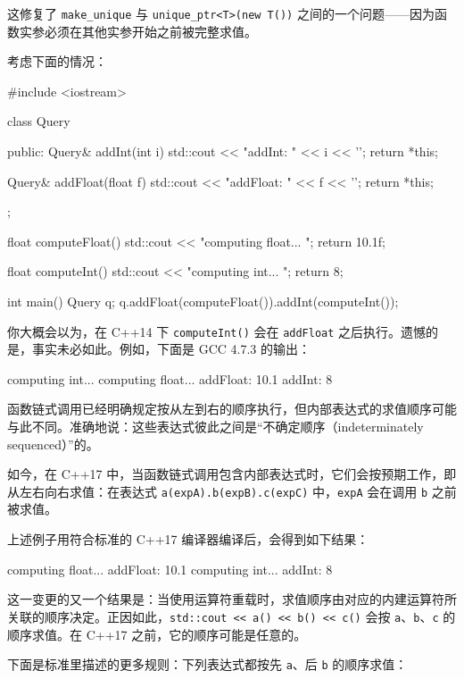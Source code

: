 这修复了 \texttt{make\_unique} 与 \texttt{unique\_ptr<T>(new T())} 之间的一个问题——因为函数实参必须在其他实参开始之前被完整求值。

考虑下面的情况：

\begin{codebox}[cpp]
#include <iostream>

class Query
{
public:
    Query& addInt(int i)
    {
        std::cout << "addInt: " << i << '\n';
        return *this;
    }

    Query& addFloat(float f)
    {
        std::cout << "addFloat: " << f << '\n';
        return *this;
    }
};

float computeFloat()
{
    std::cout << "computing float... \n";
    return 10.1f;
}

float computeInt()
{
    std::cout << "computing int... \n";
    return 8;
}

int main()
{
    Query q;
    q.addFloat(computeFloat()).addInt(computeInt());
}
\end{codebox}

你大概会以为，在 C++14 下 \texttt{computeInt()} 会在 \texttt{addFloat} 之后执行。遗憾的是，事实未必如此。例如，下面是 GCC 4.7.3 的输出：

\begin{codebox}
computing int...
computing float...
addFloat: 10.1
addInt: 8
\end{codebox}

函数链式调用已经明确规定按从左到右的顺序执行，但内部表达式的求值顺序可能与此不同。准确地说：这些表达式彼此之间是“不确定顺序（indeterminately sequenced）”的。

如今，在 C++17 中，当函数链式调用包含内部表达式时，它们会按预期工作，即从左右向右求值：在表达式 \texttt{a(expA).b(expB).c(expC)} 中，\texttt{expA} 会在调用 \texttt{b} 之前被求值。

上述例子用符合标准的 C++17 编译器编译后，会得到如下结果：

\begin{codebox}
computing float...
addFloat: 10.1
computing int...
addInt: 8
\end{codebox}

这一变更的又一个结果是：当使用运算符重载时，求值顺序由对应的内建运算符所关联的顺序决定。正因如此，\texttt{std::cout << a() << b() << c()} 会按 \texttt{a}、\texttt{b}、\texttt{c} 的顺序求值。在 C++17 之前，它的顺序可能是任意的。

下面是标准里描述的更多规则：下列表达式都按先 \texttt{a}、后 \texttt{b} 的顺序求值：


